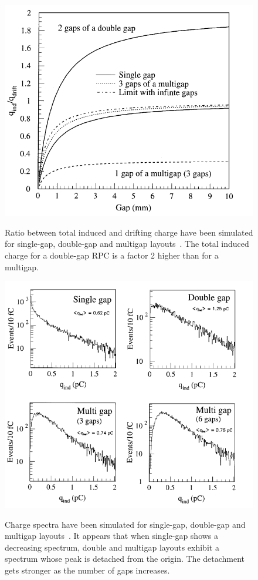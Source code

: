 	\begin{figure}[H]
		\centering
		\includegraphics[width = 0.6\plotwidth]{fig/chapt4/Layout_charge_ratio.png}\\
		\caption{\label{fig:ChargeRatio} Ratio between total induced and drifting charge have been simulated for single-gap, double-gap and multigap layouts~\cite{ABBRESCIA99}. The total induced charge for a double-gap RPC is a factor 2 higher than for a multigap.}
	\end{figure}
	
	\begin{figure}[H]
		\centering
		\includegraphics[width = \plotwidth]{fig/chapt4/Layout_charge_distributions.png}\\
		\caption{\label{fig:ChargeSpectra} Charge spectra have been simulated for single-gap, double-gap and multigap layouts~\cite{ABBRESCIA99}. It appears that when single-gap shows a decreasing spectrum, double and multigap layouts exhibit a spectrum whose peak is detached from the origin. The detachment gets stronger as the number of gaps increases.}
	\end{figure}
	
